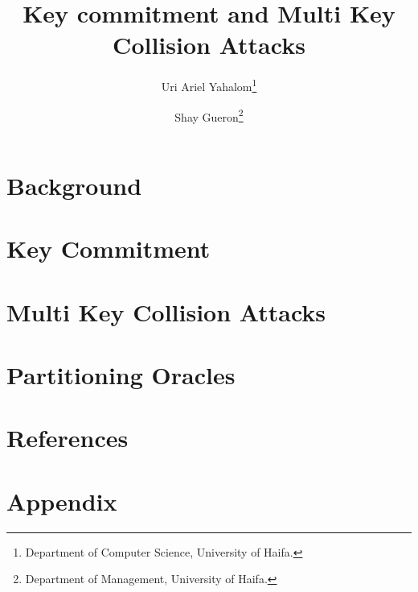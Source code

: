 \documentclass[12pt]{article}
\title{Key commitment and Multi Key Collision Attacks}
\author{Uri Ariel Yahalom\thanks{Department of Computer Science, University of Haifa.}
\and Shay Gueron\thanks{Department of Management, University of Haifa.}}
\date{}
\begin{document}
    
    \newpage


    \section{Background}\label{sec:background}
    
    \newpage


    \section{Key Commitment}\label{sec:key-commitment}
    
    \newpage


    \section{Multi Key Collision Attacks}\label{sec:multi-key-collision-attacks}
    
    \newpage


    \section{Partitioning Oracles}\label{sec:partitioning-oracles}
    
    \newpage

    \section*{References}
    
    \newpage


    \section*{Appendix}
    
    \newpage
\end{document}
